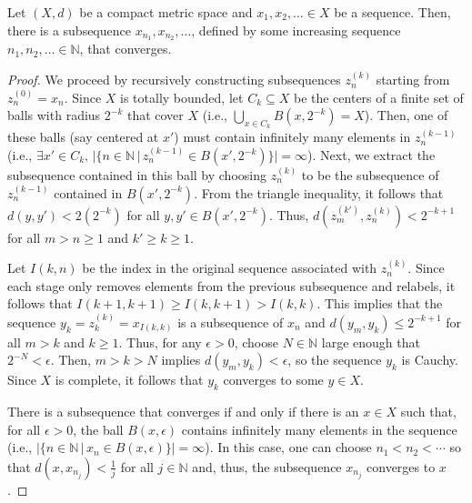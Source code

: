 \begin{theorem}
Let $(X,d)$ be a compact metric space and $x_1,x_2,\ldots \in X$ be a sequence.
Then, there is a subsequence $x_{n_1},x_{n_2},\ldots$, defined by some increasing sequence $n_1,n_2,\ldots \in \mathbb{N}$, that converges.
\end{theorem}
\begin{proof}
We proceed by recursively constructing subsequences $z^{(k)}_n$ starting from $z^{(0)}_n = x_n$.
Since $X$ is totally bounded, let $C_k \subseteq X$ be the centers of a finite set of balls with radius $2^{-k}$ that cover $X$ (i.e., $\bigcup_{x\in C_k} B(x,2^{-k}) = X$).
Then, one of these balls (say centered at $x'$) must contain infinitely many elements in $z^{(k-1)}_n$ (i.e., $\exists x' \in C_k, \,|\{n\in \mathbb{N}\,|\,z^{(k-1)}_n \in B(x',2^{-k})\}|=\infty$).
Next, we extract the subsequence contained in this ball by choosing $z^{(k)}_n$ to be the subsequence of $z^{(k-1)}_n$ contained in $B(x',2^{-k})$.
From the triangle inequality, it follows that $d(y,y')<2(2^{-k})$ for all $y,y'\in B(x',2^{-k})$.
Thus, $d(z^{(k')}_m,z^{(k)}_n) < 2^{-k+1}$ for all $m>n\geq 1$ and $k'\geq k \geq 1$.

Let $I(k,n)$ be the index in the original sequence associated with $z^{(k)}_n$.
Since each stage only removes elements from the previous subsequence and relabels, it follows that $I(k+1,k+1) \geq I(k,k+1) > I(k,k)$.
This implies that the sequence $y_k = z^{(k)}_k = x_{I(k,k)}$ is a subsequence of $x_n$ and
$d(y_m,y_k) \leq 2^{-k+1}$ for all $m>k$ and $k\geq1$.
Thus, for any $\epsilon>0$, choose $N\in\mathbb N$ large enough that $2^{-N}<\epsilon$.
Then, $m>k>N$ implies $d(y_m,y_k)<\epsilon$, so the sequence $y_k$ is Cauchy.
Since $X$ is complete, it follows that $y_k$ converges to some $y\in X$.

\iffalse
There is a subsequence that converges  if and only if there is an $x\in X$ such that, for all $\epsilon>0$, the ball $B(x,\epsilon)$ contains infinitely many elements in the sequence (i.e., $|\{n\in \mathbb{N}\,|\,x_n \in B(x,\epsilon)\}|=\infty$).
In this case, one can choose $n_1 < n_2 < \cdots$ so that $d(x,x_{n_j}) \! < \! \frac{1}{j}$ for all $j\in \mathbb{N}$ and, thus, the subsequence $x_{n_j}$ converges to $x$.


\end{proof}
